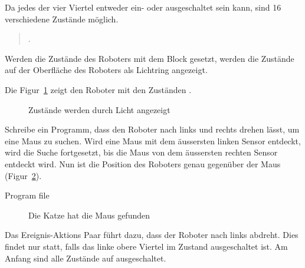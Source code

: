 Da jedes der vier Viertel entweder ein- oder ausgeschaltet sein kann, sind 16 verschiedene Zustände möglich.

\begin{quote}
.
\end{quote}

Werden die Zustände des Roboters mit dem Block  gesetzt, werden die Zustände auf der Oberfläche des Roboters als Lichtring angezeigt.

Die Figur~\ref{fig.state-leds} zeigt den Roboter mit den Zuständen .


\begin{figure}
\begin{center}
\caption{Zustände werden durch Licht angezeigt}
\label{fig.state-leds}
\end{center}
\end{figure}


Schreibe ein Programm, dass den Roboter nach links und rechts drehen lässt, um eine Maus zu suchen. Wird eine Maus mit dem äussersten linken Sensor entdeckt, wird die Suche fortgesetzt, bis die Maus von dem äussersten rechten Sensor entdeckt wird. Nun ist die Position des Roboters genau gegenüber der Maus (Figur~\ref{fig.cat-mouse}).

{\raggedleft \hfill Program file }


\begin{figure}
\begin{center}
\caption{Die Katze hat die Maus gefunden}
\label{fig.cat-mouse}
\end{center}
\end{figure}

Das Ereignis-Aktions Paar  führt dazu, dass der Roboter nach links abdreht. Dies findet nur statt, falls das linke obere Viertel im Zustand ausgeschaltet ist. Am Anfang sind alle Zustände auf ausgeschaltet.


